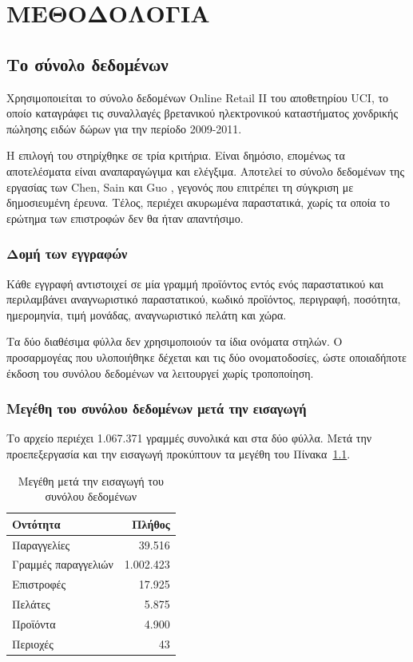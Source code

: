 \chapter{ΜΕΘΟΔΟΛΟΓΙΑ}
\label{chap:methodology}

\section{Το σύνολο δεδομένων}

Χρησιμοποιείται το σύνολο δεδομένων \textenglish{Online Retail II} του
αποθετηρίου \textenglish{UCI}, το οποίο καταγράφει τις συναλλαγές βρετανικού
ηλεκτρονικού καταστήματος χονδρικής πώλησης ειδών δώρων για την περίοδο
2009-2011.

Η επιλογή του στηρίχθηκε σε τρία κριτήρια. Είναι δημόσιο, επομένως τα
αποτελέσματα είναι αναπαραγώγιμα και ελέγξιμα. Αποτελεί το σύνολο δεδομένων
της εργασίας των Chen, Sain και Guo \cite{chen2012data}, γεγονός που επιτρέπει
τη σύγκριση με δημοσιευμένη έρευνα. Τέλος, περιέχει ακυρωμένα παραστατικά,
χωρίς τα οποία το ερώτημα των επιστροφών δεν θα ήταν απαντήσιμο.

\subsection{Δομή των εγγραφών}

Κάθε εγγραφή αντιστοιχεί σε μία γραμμή προϊόντος εντός ενός παραστατικού και
περιλαμβάνει αναγνωριστικό παραστατικού, κωδικό προϊόντος, περιγραφή,
ποσότητα, ημερομηνία, τιμή μονάδας, αναγνωριστικό πελάτη και χώρα.

Τα δύο διαθέσιμα φύλλα δεν χρησιμοποιούν τα ίδια ονόματα στηλών. Ο προσαρμογέας
που υλοποιήθηκε δέχεται και τις δύο ονοματοδοσίες, ώστε οποιαδήποτε έκδοση του
συνόλου δεδομένων να λειτουργεί χωρίς τροποποίηση.

\subsection{Μεγέθη του συνόλου δεδομένων μετά την εισαγωγή}

Το αρχείο περιέχει 1.067.371 γραμμές συνολικά και στα δύο φύλλα. Μετά την
προεπεξεργασία και την εισαγωγή προκύπτουν τα μεγέθη του
Πίνακα~\ref{tab:dataset-size}.

\begin{table}[H]
\centering
\caption{Μεγέθη μετά την εισαγωγή του συνόλου δεδομένων}
\label{tab:dataset-size}
\begin{tabular}{lr}
\toprule
Οντότητα & Πλήθος \\
\midrule
Παραγγελίες & 39.516 \\
Γραμμές παραγγελιών & 1.002.423 \\
Επιστροφές & 17.925 \\
Πελάτες & 5.875 \\
Προϊόντα & 4.900 \\
Περιοχές & 43 \\
\bottomrule
\end{tabular}
\end{table}

